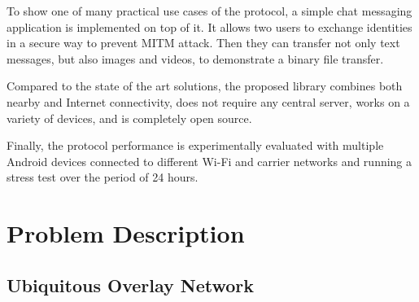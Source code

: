 
To show one of many practical use cases of the protocol, a simple chat messaging application is implemented on top of it. It allows two users to exchange identities in a secure way to prevent MITM attack. Then they can transfer not only text messages, but also images and videos, to demonstrate a binary file transfer.

Compared to the state of the art solutions, the proposed library combines both nearby and Internet connectivity, does not require any central server, works on a variety of devices, and is completely open source.

Finally, the protocol performance is experimentally evaluated with multiple Android devices connected to different Wi-Fi and carrier networks and running a stress test over the period of 24 hours.

\chapter{Problem Description}

\section{Ubiquitous Overlay Network}








